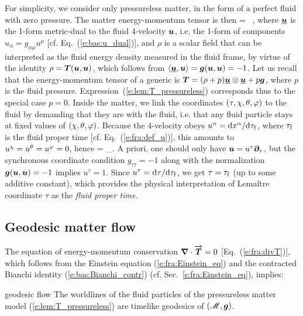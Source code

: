 For simplicity, we consider only pressureless matter, in the form of a perfect
fluid with zero pressure. The matter energy-momentum tensor is then
\be \label{e:lem:T_pressureless}
     = \rho \,  \otimes {} ,
\ee
where $\underline{\bm{u}}$ is the 1-form metric-dual to the fluid 4-velocity $\bm{u}$,
i.e. the 1-form of components $u_\alpha = g_{\alpha\mu} u^\mu$ [cf. Eq.~(\ref{e:bas:u_dual})],
and $\rho$ is a scalar field that can be interpreted as the fluid energy density
measured in the fluid frame, by virtue of the identity
$\rho = \bm{T}(\bm{u}, \bm{u})$, which follows from $\langle \underline{\bm{u}}, \bm{u} \rangle = \bm{g}(\bm{u},\bm{u}) = -1$.
Let us recall that the energy-momentum tensor of a generic
 is
$\bm{T} = (\rho + p)\underline{\bm{u}} \otimes \underline{\bm{u}} + p \bm{g}$, where $p$
is the fluid pressure. Expression~(\ref{e:lem:T_pressureless}) corresponds thus
to the special case $p=0$.
Inside the matter, we link the coordinates $(\tau,\chi,\theta,\varphi)$ to the fluid by demanding
that they are  with the fluid, i.e. that any fluid particle
stays at fixed values of $(\chi,\theta,\varphi)$.
Because the 4-velocity obeys $u^\alpha = \mathrm{d} x^\alpha/\mathrm{d} \tau_{\rm f}$, where
$\tau_{\rm f}$ is the fluid proper time [cf. Eq.~(\ref{e:fra:def_u})], this
amounts to $u^\chi=u^\theta = u^\varphi = 0$, hence
\be \label{e:lem:u_par_tau}
     = \wpar_\tau .
\ee
A priori, one should only have $\bm{u} =  u^\tau\bm{\partial}_\tau$, but the
synchronous coordinate condition $g_{\tau\tau} = -1$ along with the
normalization $\bm{g}(\bm{u},\bm{u})=-1$ implies $u^\tau=1$. Since $u^\tau = \mathrm{d}\tau / \mathrm{d}\tau_{\rm f}$, we get $\tau = \tau_{\rm f}$ (up to some additive constant), which provides the physical
interpretation of Lemaître coordinate $\tau$ as the \emph{fluid proper time}.

\subsection{Geodesic matter flow}

The equation of energy-momentum conservation $\bm{\nabla}\cdot\overrightarrow{\bm{T}} = 0$
[Eq.~(\ref{e:fra:divT})], which
follows from the Einstein equation (\ref{e:fra:Einstein_eq}) and the contracted
Bianchi identity (\ref{e:bas:Bianchi_contr}) (cf. Sec.~\ref{s:fra:Einstein_eq}),
implies:
\begin{tprop}{geodesic flow}{}
The worldlines of the fluid particles of the pressureless matter
model (\ref{e:lem:T_pressureless}) are timelike geodesics of
$(\mathscr{M},\bm{g})$.
\end{tprop}

